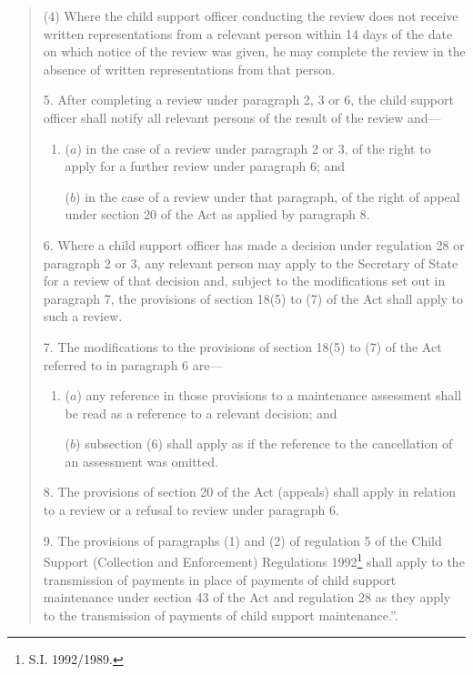 \documentclass[12pt,a4paper]{article}
\begin{document}
\begin{quotation}
(4) Where the child support officer conducting the review does not receive written representations from a relevant person within 14 days of the date on which notice of the review was given, he may complete the review in the absence of written representations from that person.

\medskip

5.  After completing a review under paragraph 2, 3 or 6, the child support officer shall notify all relevant persons of the result of the review and---
\begin{enumerate}\item[]
($a$) in the case of a review under paragraph 2 or 3, of the right to apply for a further review under paragraph 6; and

($b$) in the case of a review under that paragraph, of the right of appeal under section 20 of the Act as applied by paragraph 8.
\end{enumerate}

\medskip

6.  Where a child support officer has made a decision under regulation 28 or paragraph 2 or 3, any relevant person may apply to the Secretary of State for a review of that decision and, subject to the modifications set out in paragraph 7, the provisions of section 18(5) to (7) of the Act shall apply to such a review.

\medskip

7.  The modifications to the provisions of section 18(5) to (7) of the Act referred to in paragraph 6 are---
\begin{enumerate}\item[]
($a$) any reference in those provisions to a maintenance assessment shall be read as a reference to a relevant decision; and

($b$) subsection (6) shall apply as if the reference to the cancellation of an assessment was omitted.
\end{enumerate}

8.  The provisions of section 20 of the Act (appeals) shall apply in relation to a review or a refusal to review under paragraph 6.

\medskip

9.  The provisions of paragraphs (1) and (2) of regulation 5 of the Child Support (Collection and Enforcement) Regulations 1992\footnote{\frenchspacing  S.I. 1992/1989.} shall apply to the transmission of payments in place of payments of child support maintenance under section 43 of the Act and regulation 28 as they apply to the transmission of payments of child support maintenance.”. 
\end{quotation}
\end{document}
